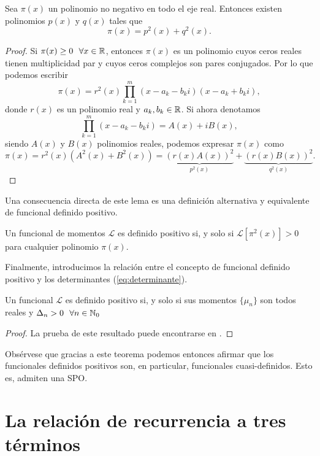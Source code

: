 \begin{lema}
Sea $\pi(x)$ un polinomio no negativo en todo el eje real. Entonces existen polinomios $p(x)$ y $q(x)$ tales que 
$$
\pi(x) = p^2(x) + q^2(x).
$$
\end{lema}
\begin{proof}
    Si $\pi(x) \geq 0 \ \ \forall x\in\R$, entonces $\pi(x)$ es un polinomio cuyos ceros reales tienen multiplicidad par y cuyos ceros complejos son pares conjugados. Por lo que podemos escribir
    $$
    \pi(x) = r^2(x) \prod_{k=1}^m(x-a_k-b_k i)(x-a_k+b_k i),
    $$
    donde $r(x)$ es un polinomio real y $a_k,b_k\in\mathbb{R}$. Si ahora denotamos
    $$
    \prod_{k=1}^m(x-a_k-b_k i) = A(x) + i B(x),
    $$
    siendo $A(x)$ y $B(x)$ polinomios reales, podemos expresar $\pi(x)$ como
    $$
    \pi(x) = r^2(x)(A^2(x) + B^2(x)) = \underbrace{(r(x)A(x))^2}_{p^2(x)} + \underbrace{(r(x)B(x))^2}_{q^2(x)}.
    $$
\end{proof}

Una consecuencia directa de este lema es una definición alternativa y equivalente de funcional definido positivo.

\begin{corolario}
    Un funcional de momentos $\mathcal{L}$ es definido positivo si, y solo si $\mathcal{L}[\pi^2(x)]>0$ para cualquier polinomio $\pi(x)$.
\end{corolario}

Finalmente, introducimos la relación entre el concepto de funcional definido positivo y los determinantes (\ref{eq:determinante}).

\begin{teorema}
    Un funcional $\mathcal{L}$ es definido positivo si, y solo si sus momentos $\{\mu_n\}$ son todos reales y $\Delta_n>0 \ \ \forall n\in\mathbb{N}_0$
\end{teorema}
\begin{proof}
    La prueba de este resultado puede encontrarse en \cite[Teorema 3.4]{chihara}.
\end{proof}

Obsérvese que gracias a este teorema podemos entonces afirmar que los funcionales definidos positivos son, en particular, funcionales cuasi-definidos. Esto es, admiten una SPO.

\section{La relación de recurrencia a tres términos}
\label{section:RRTT}

